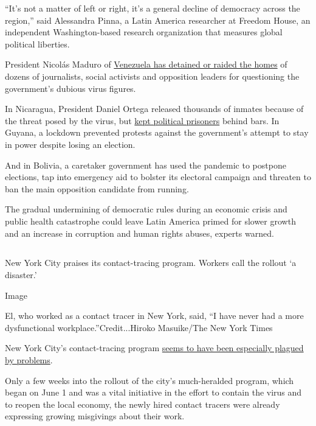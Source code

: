 ``It's not a matter of left or right, it's a general decline of
democracy across the region,'' said Alessandra Pinna, a Latin America
researcher at Freedom House, an independent Washington-based research
organization that measures global political liberties.

President Nicolás Maduro of
\href{https://www.nytimes3xbfgragh.onion/2020/06/19/world/americas/venezuela-forced-disappearances-Maduro.html}{Venezuela
has detained or raided the homes} of dozens of journalists, social
activists and opposition leaders for questioning the government's
dubious virus figures.

In Nicaragua, President Daniel Ortega released thousands of inmates
because of the threat posed by the virus, but
\href{https://www.barrons.com/news/nicaragua-excludes-political-prisoners-from-mass-release-01586430304}{kept
political prisoners} behind bars. In Guyana, a lockdown prevented
protests against the government's attempt to stay in power despite
losing an election.

And in Bolivia, a caretaker government has used the pandemic to postpone
elections, tap into emergency aid to bolster its electoral campaign and
threaten to ban the main opposition candidate from running.

The gradual undermining of democratic rules during an economic crisis
and public health catastrophe could leave Latin America primed for
slower growth and an increase in corruption and human rights abuses,
experts warned.

\hypertarget{-9}{%
\subsection{}\label{-9}}

New York City praises its contact-tracing program. Workers call the
rollout `a disaster.'

Image

El, who worked as a contact tracer in New York, said, ``I have never had
a more dysfunctional workplace.''Credit...Hiroko Masuike/The New York
Times

New York City's contact-tracing program
\href{https://www.nytimes3xbfgragh.onion/2020/07/29/nyregion/new-york-contact-tracing.html}{seems
to have been especially plagued by problems}.

Only a few weeks into the rollout of the city's much-heralded program,
which began on June 1 and was a vital initiative in the effort to
contain the virus and to reopen the local economy, the newly hired
contact tracers were already expressing growing misgivings about their
work.

